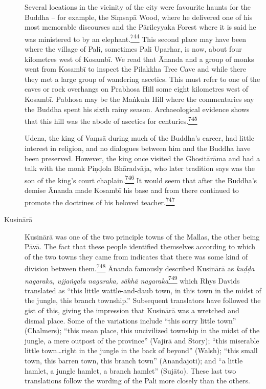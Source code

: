 \begin{description}
Several locations in the vicinity of the city were favourite haunts for
the Buddha -- for example, the Siṃsapā Wood, where he delivered one of
his most memorable discourses and the Pārileyyaka Forest where it is
said he was ministered to by an
elephant.\label{footprints_split_019.html_fnref744}\hyperref[footprints_split_025.htmlux5cux23fn744]{\textsuperscript{744}}
This second place may have been where the village of Pali, sometimes
Pali Uparhar, is now, about four kilometres west of Kosambī. We read
that Ānanda and a group of monks went from Kosambī to inspect the
Pilakkha Tree Cave and while there they met a large group of wandering
ascetics. This must refer to one of the caves or rock overhangs on
Prabhosa Hill some eight kilometres west of Kosambī. Pabhosa may be the
Maṅkula Hill where the commentaries say the Buddha spent his sixth rainy
season. Archaeological evidence shows that this hill was the abode of
ascetics for
centuries.\label{footprints_split_019.html_fnref745}\hyperref[footprints_split_025.htmlux5cux23fn745]{\textsuperscript{745}}

Udena, the king of Vaṃsā during much of the Buddha's career, had little
interest in religion, and no dialogues between him and the Buddha have
been preserved. However, the king once visited the Ghositārāma and had a
talk with the monk Piṇḍola Bhāradvāja, who later tradition says was the
son of the king's court
chaplain.\label{footprints_split_019.html_fnref746}\hyperref[footprints_split_025.htmlux5cux23fn746]{\textsuperscript{746}}
It would seem that after the Buddha's demise Ānanda made Kosambī his
base and from there continued to promote the doctrines of his beloved
teacher.\label{footprints_split_019.html_fnref747}\hyperref[footprints_split_025.htmlux5cux23fn747]{\textsuperscript{747}}
\item[Kusinārā]
Kusinārā was one of the two principle towns of the Mallas, the other
being Pāvā. The fact that these people identified themselves according
to which of the two towns they came from indicates that there was some
kind of division between
them.\label{footprints_split_019.html_fnref748}\hyperref[footprints_split_025.htmlux5cux23fn748]{\textsuperscript{748}}
Ānanda famously described Kusinārā as \emph{kuḍḍa nagaraka, ujjaṅgala}
\emph{nagaraka, sākhā
nagaraka}\label{footprints_split_019.html_fnref749}\hyperref[footprints_split_025.htmlux5cux23fn749]{\textsuperscript{749}}
which Rhys Davids translated as ``this little wattle-and-daub town, in
this town in the midst of the jungle, this branch township.'' Subsequent
translators have followed the gist of this, giving the impression that
Kusinārā was a wretched and dismal place. Some of the variations include
``this sorry little town'' (Chalmers); ``this mean place, this
uncivilized township in the midst of the jungle, a mere outpost of the
province'' (Vajirā and Story); ``this miserable little town\ldots right
in the jungle in the back of beyond'' (Walsh); ``this small town, this
barren town, this branch town'' (Anandajoti); and ``a little hamlet, a
jungle hamlet, a branch hamlet'' (Sujāto). These last two translations
follow the wording of the Pali more closely than the others.


\end{description}
